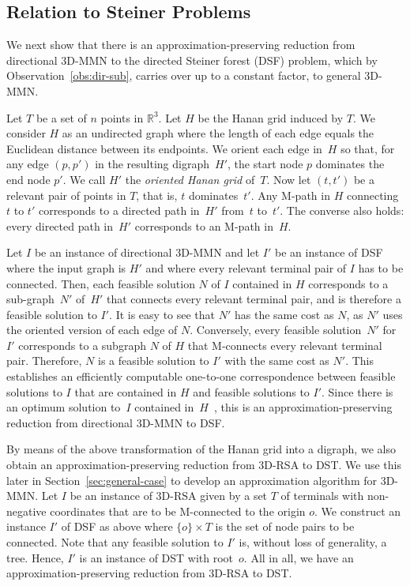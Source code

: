 \documentclass[11pt]{llncs}
\begin{document}
\subsection{Relation to Steiner Problems}
\label{sec:relat-stein-type}

We next show that there is an approximation-preserving reduction
from directional 3D-MMN to the directed Steiner forest (DSF) problem,
which by Observation~\ref{obs:dir-sub}, carries over up to a constant
factor, to general 3D-MMN. 

Let $T$ be a set of $n$ points in $\mathbb{R}^3$.  Let $H$ be the
Hanan grid induced by $T$.  We consider $H$ as an undirected graph
where the length of each edge equals the Euclidean distance between
its endpoints.  We orient each edge in~$H$ so that, for any edge
$(p,p')$ in 
the resulting digraph~$H'$, the start node $p$ dominates the end node
$p'$.  We call $H'$ the \emph{oriented Hanan grid} of~$T$.  
Now let
$(t,t')$ be a relevant pair of points in $T$, that is, $t$
dominates~$t'$.  Any M-path in $H$ connecting $t$ to $t'$ corresponds
to a directed path in~$H'$ from~$t$ to~$t'$.  The converse also holds:
every directed path in~$H'$ corresponds to an M-path in~$H$.

Let $I$ be an instance of directional 3D-MMN and let $I'$ be an 
instance of DSF where the input graph is $H'$ and where every relevant
terminal pair of $I$ has to be connected.  Then, each feasible solution $N$
of $I$ contained in $H$ corresponds to a sub-graph~$N'$ of~$H'$ that
connects every relevant terminal pair, and is therefore a 
feasible solution to $I'$.  It is easy to see that $N'$ has the same
cost as $N$, 
as $N'$ uses the oriented version of each edge of $N$.
Conversely, every feasible solution~$N'$ for~$I'$ corresponds to a
subgraph $N$ of $H$ that M-connects every relevant terminal pair.
Therefore, $N$ is a feasible solution to $I'$ with the same cost as
$N'$.  This establishes an efficiently computable one-to-one
correspondence between feasible solutions to $I$ that are contained in
$H$ and feasible solutions to $I'$.  Since there is an optimum
solution to~$I$ contained in~$H$~\cite{gln-ammn-01}, this is an
approximation-preserving reduction from directional 3D-MMN to DSF.

By means of the above transformation of the Hanan grid into a digraph,
we also obtain an approximation-preserving reduction from 3D-RSA to
DST.  We use this later in
Section~\ref{sec:general-case} to develop an approximation algorithm
for 3D-MMN.  Let $I$ be an instance of 3D-RSA given by a set $T$ of
terminals with non-negative coordinates that are to be M-connected to
the origin $o$.  We construct an instance $I'$ of DSF as above where
$\{o\}\times T$ is the set of node pairs to be connected.
Note that any feasible solution to $I'$ is, without loss of
generality, a tree.  Hence, $I'$ is an instance of DST with root~$o$.
All in all, we have an approximation-preserving reduction from 3D-RSA
to DST. 
\end{document}
